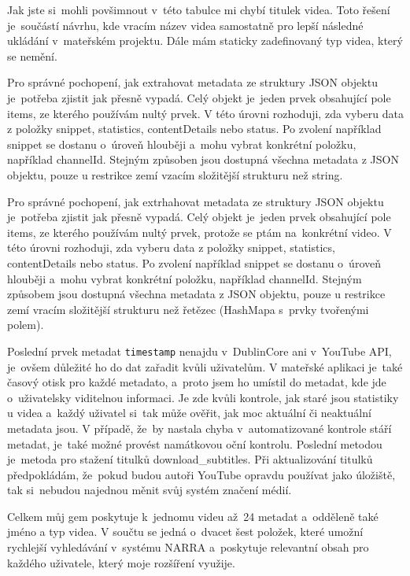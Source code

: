 \par Jak jste si~mohli povšimnout v~této tabulce mi chybí titulek videa. Toto řešení je~součástí návrhu, kde vracím název videa samostatně pro lepší následné ukládání v~mateřském projektu. Dále mám staticky zadefinovaný typ videa, který se nemění. 
\par Pro správné pochopení, jak extrahovat metadata ze struktury JSON objektu je~potřeba zjistit jak přesně vypadá. Celý objekt je~jeden prvek obsahující pole items, ze kterého používám nultý prvek. V této úrovni rozhoduji, zda vyberu data z položky snippet, statistics, contentDetails nebo status. Po zvolení například snippet se dostanu o~úroveň hlouběji a~mohu vybrat konkrétní položku, například channelId. Stejným způsoben jsou dostupná všechna metadata z JSON objektu, pouze u restrikce zemí vzacím složitější strukturu než string.

\par Pro správné pochopení, jak extrhahovat metadata ze struktury JSON objektu je~potřeba zjistit jak přesně vypadá. Celý objekt je~jeden prvek obsahující pole items, ze kterého používám nultý prvek, protože se ptám na~konkrétní video. V této úrovni rozhoduji, zda vyberu data z položky snippet, statistics, contentDetails nebo status. Po zvolení například snippet se dostanu o~úroveň hlouběji a~mohu vybrat konkrétní položku, například channelId. Stejným způsobem jsou dostupná všechna metadata z JSON objektu, pouze u restrikce zemí vracím složitější strukturu než řetězec (HashMapa s~prvky tvořenými polem).
\par Poslední prvek metadat \texttt{timestamp} nenajdu v~DublinCore ani v~YouTube API, je~ovšem důležité ho do dat zařadit kvůli uživatelům. V mateřské aplikaci je~také časový otisk pro každé metadato, a~proto jsem ho umístil do metadat, kde jde o~uživatelsky viditelnou informaci. Je zde kvůli kontrole, jak staré jsou statistiky u videa a~každý uživatel si~tak může ověřit, jak moc aktuální či neaktuální metadata jsou. V případě, že~by nastala chyba v~automatizované kontrole stáří metadat, je~také možné provést namátkovou oční kontrolu. Poslední metodou je~metoda pro stažení titulků download\_subtitles. Při aktualizování titulků předpokládám, že~pokud budou autoři YouTube opravdu používat jako úložiště, tak si~nebudou najednou měnit svůj systém značení médií.
\par Celkem můj gem poskytuje k~jednomu videu až~24 metadat a~odděleně také jméno a typ videa. V součtu se jedná o~dvacet šest položek, které umožní rychlejší vyhledávání v~systému NARRA a~poskytuje relevantní obsah pro každého uživatele, který moje rozšíření využije.

